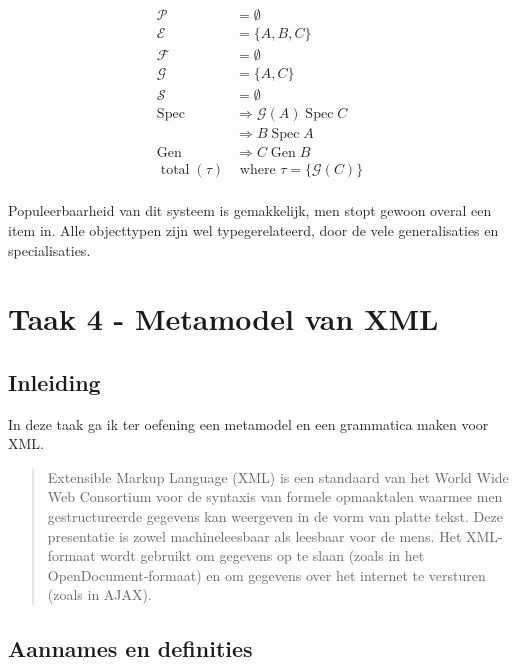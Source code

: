 \documentclass[11pt]{article}
\newcommand{\Spec}{\ensuremath{\operatorname{Spec}}}
\newcommand{\Gen}{\ensuremath{\operatorname{Gen}}}
\newcommand{\total}{\ensuremath{\operatorname{total}}}
\begin{document}
\begin{align*}
  \mathcal{P}   & = \emptyset                               \\
  \mathcal{E}   & = \{A, B, C\}                             \\
  \mathcal{F}   & = \emptyset                               \\
  \mathcal{G}   & = \{A, C\}                                \\
  \mathcal{S}   & = \emptyset                               \\
  \Spec         & \Rightarrow \mathcal{G} (A) \Spec C       \\
                & \Rightarrow B \Spec A                     \\
  \Gen          & \Rightarrow C \Gen B                      \\
  \total (\tau) & \text{ where } \tau = \{\mathcal{G} (C)\} \\
\end{align*}

Populeerbaarheid van dit systeem is gemakkelijk, men stopt gewoon overal een
item in. Alle objecttypen zijn wel typegerelateerd, door de vele generalisaties
en specialisaties.


\section{Taak 4 - Metamodel van XML}

\subsection{Inleiding}

In deze taak ga ik ter oefening een metamodel en een grammatica maken voor XML. 

\begin{quote}

Extensible Markup Language (XML) is een standaard van het World Wide Web
Consortium voor de syntaxis van formele opmaaktalen waarmee men gestructureerde
gegevens kan weergeven in de vorm van platte tekst. Deze presentatie is zowel
machineleesbaar als leesbaar voor de mens. Het XML-formaat wordt gebruikt om
gegevens op te slaan (zoals in het OpenDocument-formaat) en om gegevens over
het internet te versturen (zoals in AJAX).\cite{xmlwikipedia}
\end{quote}

\subsection{Aannames en definities}
\end{document}
